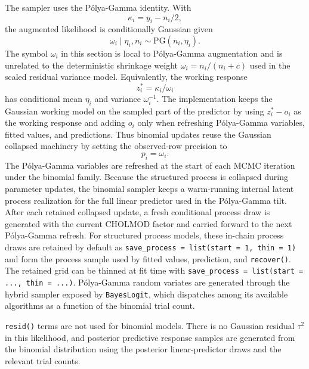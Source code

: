 \documentclass[11pt]{article}
\begin{document}
The sampler uses the P{\'o}lya-Gamma identity. With
\begin{equation}
  \kappa_i = y_i - n_i/2,
\end{equation}
the augmented likelihood is conditionally Gaussian given
\begin{equation}
  \omega_i \mid \eta_i,n_i \sim \mathrm{PG}(n_i,\eta_i).
\end{equation}
The symbol $\omega_i$ in this section is local to P{\'o}lya-Gamma augmentation and is unrelated to the deterministic shrinkage weight $\omega_i=n_i/(n_i+c)$ used in the scaled residual variance model. Equivalently, the working response
\begin{equation}
  z_i^\ast = \kappa_i/\omega_i
\end{equation}
has conditional mean $\eta_i$ and variance $\omega_i^{-1}$. The implementation keeps the Gaussian working model on the sampled part of the predictor by using $z_i^\ast-o_i$ as the working response and adding $o_i$ only when refreshing P{\'o}lya-Gamma variables, fitted values, and predictions. Thus binomial updates reuse the Gaussian collapsed machinery by setting the observed-row precision to
\begin{equation}
  p_i = \omega_i.
\end{equation}
The P{\'o}lya-Gamma variables are refreshed at the start of each MCMC iteration under the binomial family. Because the structured process is collapsed during parameter updates, the binomial sampler keeps a warm-running internal latent process realization for the full linear predictor used in the P{\'o}lya-Gamma tilt. After each retained collapsed update, a fresh conditional process draw is generated with the current CHOLMOD factor and carried forward to the next P{\'o}lya-Gamma refresh. For structured process models, these in-chain process draws are retained by default as \texttt{save\_process = list(start = 1, thin = 1)} and form the process sample used by fitted values, prediction, and \texttt{recover()}. The retained grid can be thinned at fit time with \texttt{save\_process = list(start = ..., thin = ...)}. P{\'o}lya-Gamma random variates are generated through the hybrid sampler exposed by \texttt{BayesLogit}, which dispatches among its available algorithms as a function of the binomial trial count.

\texttt{resid()} terms are not used for binomial models. There is no Gaussian residual $\tau^2$ in this likelihood, and posterior predictive response samples are generated from the binomial distribution using the posterior linear-predictor draws and the relevant trial counts.
\end{document}
